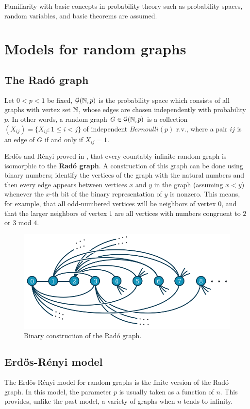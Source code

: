 Familiarity with basic concepts in probability theory such as probability spaces, random variables, and basic theorems are assumed.

\section{Models for random graphs}

\subsection{The Radó graph}
Let $0 < p < 1$ be fixed, $\mathcal{G}(\mathbb{N}, p)$ is the probability space which consists of all graphs with vertex set $\mathbb{N}$, whose edges are chosen independently with probability $p$. In other words, a random graph $G \in \mathcal{G}(\mathbb{N},p)$ is a collection $(X_{ij}) = \{ X_{ij} : 1 \leq i < j\}$ of independent $Bernoulli(p)$ r.v., where a pair $ij$ is an edge of $G$ if and only if $X_{ij} = 1$.

Erdős and Rényi proved in \cite[Erdős, Rényi 63]{RadoUnique}, that every countably infinite random graph is isomorphic to the \textbf{Radó graph}. A construction of this graph can be done using binary numbers; identify the vertices of the graph with the natural numbers and then every edge appears between vertices $x$ and $y$ in the graph (assuming $x < y$) whenever the $x$-th bit of the binary representation of $y$ is nonzero. This means, for example, that all odd-numbered vertices will be neighbors of vertex $0$, and that the larger neighbors of vertex $1$ are all vertices with numbers congruent to $2$ or $3$ mod $4$.

\begin{figure}[h!]
	\centering
	\includegraphics[scale=0.7]{Figures/Rado-graph.png}
	\caption{Binary construction of the Radó graph.}
\end{figure}

\subsection{Erdős-Rényi model}
The Erdős-Rényi model for random graphs is the finite version of the Radó graph. In this model, the parameter $p$ is usually taken as a function of $n$. This provides, unlike the past model, a variety of graphs when $n$ tends to infinity.

